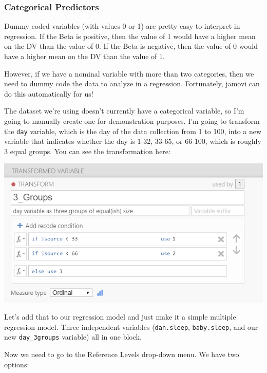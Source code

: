 \documentclass[
]{book}
\begin{document}
\hypertarget{categorical-predictors}{%
\subsubsection{Categorical Predictors}\label{categorical-predictors}}

Dummy coded variables (with values 0 or 1) are pretty easy to interpret in regression. If the Beta is positive, then the value of 1 would have a higher mean on the DV than the value of 0. If the Beta is negative, then the value of 0 would have a higher mean on the DV than the value of 1.

However, if we have a nominal variable with more than two categories, then we need to dummy code the data to analyze in a regression. Fortunately, jamovi can do this automatically for us!

The dataset we're using doesn't currently have a categorical variable, so I'm going to manually create one for demonstration purposes. I'm going to transform the \texttt{day} variable, which is the day of the data collection from 1 to 100, into a new variable that indicates whether the day is 1-32, 33-65, or 66-100, which is roughly 3 equal groups. You can see the transformation here:

\includegraphics{images/13-regression/transform.png}

Let's add that to our regression model and just make it a simple multiple regression model. Three independent variables (\texttt{dan.sleep}, \texttt{baby.sleep}, and our new \texttt{day\_3groups} variable) all in one block.

Now we need to go to the Reference Levels drop-down menu. We have two options:
\end{document}
